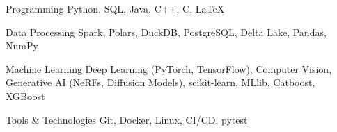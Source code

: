 

\begin{cvskills}

  \cvskill
    {Programming} %
    {Python, SQL, Java, C++, C, LaTeX} %

  \cvskill
    {Data Processing} %
    {Spark, Polars, DuckDB, PostgreSQL, Delta Lake, Pandas, NumPy} %

  \cvskill
    {Machine Learning} %
    {Deep Learning (PyTorch, TensorFlow), Computer Vision, Generative AI (NeRFs, Diffusion Models), scikit-learn, MLlib, Catboost, XGBoost} %

  \cvskill
    {Tools \& Technologies} %
    {Git, Docker, Linux, CI/CD, pytest} %

\end{cvskills}

